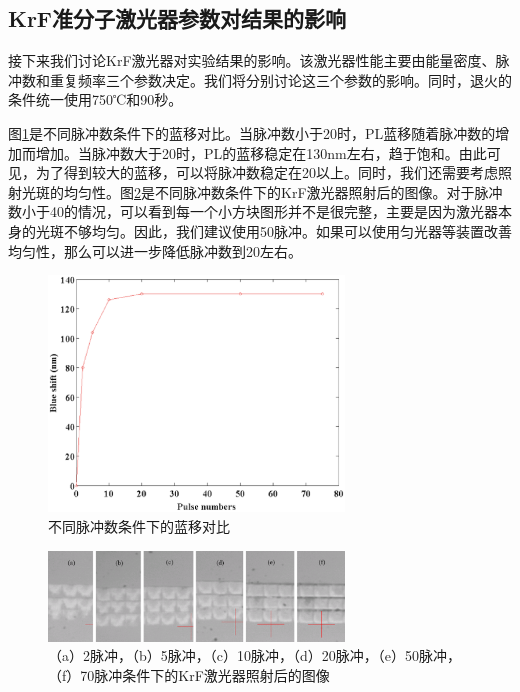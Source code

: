 \documentclass{ZJUthesis}
\begin{document}
\subsection{KrF准分子激光器参数对结果的影响}

接下来我们讨论KrF激光器对实验结果的影响。该激光器性能主要由能量密度、脉冲数和重复频率三个参数决定。我们将分别讨论这三个参数的影响。同时，退火的条件统一使用750℃和90秒。

图\ref{fig_qwi_pulse}是不同脉冲数条件下的蓝移对比。当脉冲数小于20时，PL蓝移随着脉冲数的增加而增加。当脉冲数大于20时，PL的蓝移稳定在130nm左右，趋于饱和。由此可见，为了得到较大的蓝移，可以将脉冲数稳定在20以上。同时，我们还需要考虑照射光斑的均匀性。图\ref{fig_qwi_pulse2}是不同脉冲数条件下的KrF激光器照射后的图像。对于脉冲数小于40的情况，可以看到每一个小方块图形并不是很完整，主要是因为激光器本身的光斑不够均匀。因此，我们建议使用50脉冲。如果可以使用匀光器等装置改善均匀性，那么可以进一步降低脉冲数到20左右。

\begin{figure}[!t]
    \centering
    \includegraphics[width=0.7\textwidth]{./Pictures/qwi_pulse.eps}
    \caption{不同脉冲数条件下的蓝移对比}
    \label{fig_qwi_pulse}
\end{figure}

\begin{figure}[!t]
    \centering
    \includegraphics[width=0.7\textwidth]{./Pictures/qwi_pulse2.eps}
    \caption{（a）2脉冲，（b）5脉冲，（c）10脉冲，（d）20脉冲，（e）50脉冲，（f）70脉冲条件下的KrF激光器照射后的图像}
    \label{fig_qwi_pulse2}
\end{figure}
\end{document}
